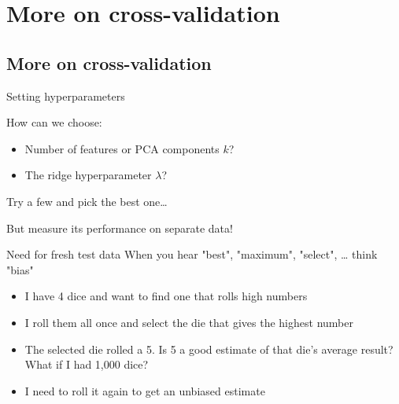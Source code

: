 \documentclass[presentation,mathserif,table]{beamer}
\begin{document}
\section{More on cross-validation}
\label{sec:orge357a9b}
\subsection{More on cross-validation}
\label{sec:org8aeb564}

\begin{frame}[label={sec:org8bf626b}]{Setting hyperparameters}
\begin{block}{How can we choose:}
\begin{itemize}
\item Number of features or PCA components \(k\)?
\item The ridge hyperparameter \(\lambda\)?
\end{itemize}
\end{block}
Try a few and pick the best one\ldots{}

But measure its performance on separate data!
\end{frame}
\begin{frame}[label={sec:org2b155b8}]{Need for fresh test data}
When you hear "best", "maximum", "select", \ldots{} think "bias"
\begin{itemize}
\item I have 4 dice and want to find one that rolls high numbers
\item I roll them all once and select the die that gives the highest number
\item The selected die rolled a 5. Is 5 a good estimate of that die's average result? What if I had 1,000 dice?
\item I need to roll it again to get an unbiased estimate
\end{itemize}
\end{frame}
\end{document}

